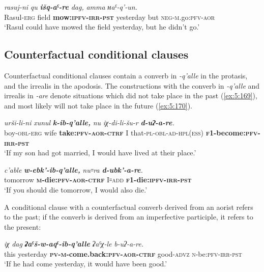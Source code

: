 ﻿\documentclass[output=paper]{langsci/langscibook}
\begin{document}
\ex \label{ex:5:168} %
\gll \emph{rasuj-ni} \emph{qu} \emph{\textbf{išq-aˤ-re}} \emph{dag,} \emph{amma} \emph{ʜaˤ-q'-un.}\\
 Rasul-\textsc{erg} field \textbf{mow:\textsc{ipfv}-\textsc{irr}-\textsc{pst}}  yesterday but \textsc{neg}-\textsc{m}.go:\textsc{pfv}-\textsc{aor} \\
\glt `Rasul could have mowed the field yesterday, but he didn't go.'
\z

\subsection{Counterfactual conditional clauses}\label{counterfactual-conditional-clauses}


Counterfactual conditional clauses contain a converb in \emph{-q'alle}
in the protasis, and the irrealis in the apodosis. The constructions
with the converb in \emph{-q'alle} and irrealis in \emph{-are} denote
situations which did not take place in the past (\ref{ex:5:169}), and most likely
will not take place in the future (\ref{ex:5:170}).

\ea \label{ex:5:169} %
\gll \emph{urši-li-ni} \emph{xunul} \emph{\textbf{k-ib-q'alle,}} \emph{nu} \emph{iχ-di-li-šu-r} \emph{\textbf{d-uʔ-a-re}.}\\
 boy-\textsc{obl}-\textsc{erg} wife \textbf{take:\textsc{pfv}-\textsc{aor}-\textsc{ctrf}} I that-\textsc{pl}-\textsc{obl}-\textsc{ad}-\textsc{hpl(ess)} \textbf{\textsc{f1}-become:\textsc{pfv}-\textsc{irr}-\textsc{pst}}\\
\glt `If my son had got married, I would have lived at their place.'

\ex \label{ex:5:170} %
\gll \emph{c'able} \emph{\textbf{w-ebk'-ib-q'alle,}} \emph{nu꞊ra} \emph{\textbf{d-ubk'-a-re}.}\\
 tomorrow \textbf{\textsc{m}-die:\textsc{pfv}-\textsc{aor}-\textsc{ctrf}} I꞊\textsc{add} \textbf{\textsc{f1}-die:\textsc{ipfv}-\textsc{irr}-\textsc{pst}}\\
\glt `If you should die tomorrow, I would also die.'
\z

A conditional clause with a counterfactual converb derived from an
aorist refers to the past; if the converb is derived from an
imperfective participle, it refers to the present:

\ea %
\gll \emph{iχ} \emph{dag} \emph{\textbf{ʡaˤš-w-aqˤ-ib-q'alle}} \emph{ʡaˤχ-le} \emph{b-uʔ-a-re.}\\
 this yesterday \textbf{\textsc{pv}-\textsc{m}-come.back:\textsc{pfv}-\textsc{aor}-\textsc{ctrf}} good-\textsc{advz} \textsc{n}-be:\textsc{pfv}-\textsc{irr}-\textsc{pst}\\
\glt `If he had come yesterday, it would have been good.'
\end{document}
